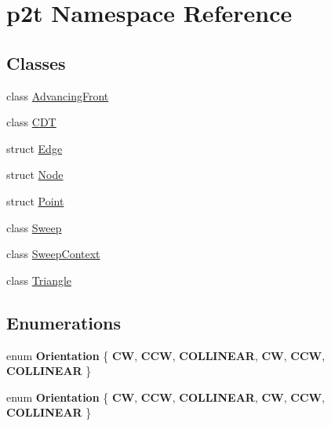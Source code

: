 \hypertarget{namespacep2t}{}\section{p2t Namespace Reference}
\label{namespacep2t}
\subsection*{Classes}
\begin{DoxyCompactItemize}
\item 
class \hyperlink{classp2t_1_1AdvancingFront}{Advancing\+Front}
\item 
class \hyperlink{classp2t_1_1CDT}{C\+DT}
\item 
struct \hyperlink{structp2t_1_1Edge}{Edge}
\item 
struct \hyperlink{structp2t_1_1Node}{Node}
\item 
struct \hyperlink{structp2t_1_1Point}{Point}
\item 
class \hyperlink{classp2t_1_1Sweep}{Sweep}
\item 
class \hyperlink{classp2t_1_1SweepContext}{Sweep\+Context}
\item 
class \hyperlink{classp2t_1_1Triangle}{Triangle}
\end{DoxyCompactItemize}
\subsection*{Enumerations}
\begin{DoxyCompactItemize}
\item 
\mbox{\label{namespacep2t_a3ffe1d5b88773615026d5e590e3662eb}} 
enum {\bfseries Orientation} \{ \newline
{\bfseries CW}, 
{\bfseries C\+CW}, 
{\bfseries C\+O\+L\+L\+I\+N\+E\+AR}, 
{\bfseries CW}, 
\newline
{\bfseries C\+CW}, 
{\bfseries C\+O\+L\+L\+I\+N\+E\+AR}
 \}
\item 
\mbox{\label{namespacep2t_a3ffe1d5b88773615026d5e590e3662eb}} 
enum {\bfseries Orientation} \{ \newline
{\bfseries CW}, 
{\bfseries C\+CW}, 
{\bfseries C\+O\+L\+L\+I\+N\+E\+AR}, 
{\bfseries CW}, 
\newline
{\bfseries C\+CW}, 
{\bfseries C\+O\+L\+L\+I\+N\+E\+AR}
 \}
\end{DoxyCompactItemize}
